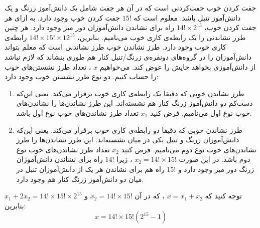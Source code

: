 \p
جفت کردن خوب جفت‌کردنی است که در آن هر جفت شامل یک دانش‌آموز زرنگ و یک دانش‌آموز تنبل باشد. معلوم است که
$15!$
جفت کردن خوب وجود دارد. به ازای هر جفت کردن خوب،
$14! \times 2^{15}$
راه برای نشاندن دانش‌آموزان دور میز وجود دارد. هر چنین طرز نشاندنی را یک رابطه‌ی کاری خوب می‌نامیم. بنابرین،
$14! \times 15! \times 12^{15}$
رابطه‌ی کاری خوب وجود دارد. طرز نشاندن خوب طرز نشاندنی است که معلم بتواند دانش‌آموزان را در گروه‌های دونفره‌ی زرنگ/تنبل کنار هم طوری بنشاند که لازم نباشد از دانش‌آموزی بخواهد جایش را عوض کند. می‌خواهیم
$x$
، تعداد طرز نشستن‌های خوب را حساب کنیم. دو نوع طرز نشستن خوب وجود دارد:
\begin{enumerate}
\item
طرز نشاندن خوبی که دقیقا یک رابطه‌ی کاری خوب برقرار می‌کند. یعنی این‌که دست‌کم دو دانش‌آموز زرنگ کنار هم نشسته‌اند. این طرز نشاندن‌ها را نشاندن‌های خوب نوع اول می‌نامیم. فرض کنید
$x_1$
تعداد طرز نشاندن‌های خوب نوع اول باشد.
\item
طرز نشاندن خوبی که دقیقا دو رابطه‌ی کاری خوب برقرار می‌کند. یعنی این‌که دانش‌آموزان زرنگ و تنبل یکی در میان نشسته‌اند. این طرز نشاندن‌ها را طرز نشاندن‌های خوب نوع دوم می‌نامیم. فرض کنید
$x_2$
تعداد طرز نشاندن‌های خوب نوع دوم باشد. در این صورت
$x_2 = 14! \times 15!$
، زیرا
$14!$
راه برای نشاندن دانش‌آموزان زرنگ دور میز وجود دارد و
$15!$
راه هم برای نشاندن هر یک از دانش‌آموزان تنبل در میان دو دانش‌آموز زرنگ کنار هم وجود دارد.
\end{enumerate}
توجه کنید که
$x = x_1 + x_2$
، که در آن
$x_2 = 14! \times 15!$
و
$x_1 + 2x_2 = 14! \times 15! \times 2^{15}$
بنابرین:
$$x = 14! \times 15!(2^{15} - 1)$$